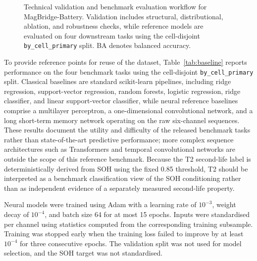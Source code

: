 \documentclass[11pt]{article}
\begin{document}
\begin{figure}[!htb]
{%
}

\caption{Technical validation and benchmark evaluation workflow for
MagBridge-Battery. Validation includes structural, distributional, ablation,
and robustness checks, while reference models are evaluated on four
downstream tasks using the cell-disjoint
\texttt{by\_cell\_primary} split. BA denotes balanced accuracy.}

\label{fig:validation_protocol}
\end{figure}

To provide reference
points for reuse of the dataset, Table~\ref{tab:baseline} reports performance
on the four benchmark tasks using the cell-disjoint
\texttt{by\_cell\_primary} split. Classical baselines are standard
scikit-learn pipelines, including ridge regression, support-vector regression,
random forests, logistic regression, ridge classifier, and linear
support-vector classifier, while neural reference baselines comprise a
multilayer perceptron, a one-dimensional convolutional network, and a long
short-term memory network operating on the raw six-channel sequences. These
results document the utility and difficulty of the released benchmark tasks
rather than state-of-the-art predictive performance; more complex sequence
architectures such as Transformers and temporal convolutional networks are
outside the scope of this reference benchmark. Because the T2 second-life
label is deterministically derived from SOH using the fixed 0.85 threshold,
T2 should be interpreted as a benchmark classification view of the SOH
conditioning rather than as independent evidence of a separately measured
second-life property.

Neural models were trained using Adam with a learning rate of $10^{-3}$, weight decay of $10^{-4}$, and batch size 64 for at most 15 epochs. Inputs were standardised per channel using statistics computed from the corresponding training subsample. Training was stopped early when the training loss failed to improve by at least $10^{-4}$ for three consecutive epochs. The validation split was not used for model selection, and the SOH target was not standardised.
\end{document}

